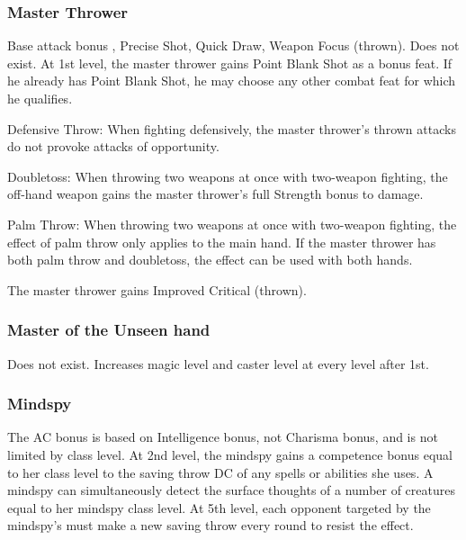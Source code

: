 \subsubsection{Master Thrower}
 Base attack bonus , Precise Shot, Quick Draw, Weapon Focus (thrown).
 Does not exist.
 At 1st level, the master thrower gains Point Blank Shot as a bonus feat. If he already has Point Blank Shot, he may choose any other combat feat for which he qualifies.
\begin{itemize*}
\item Defensive Throw: When fighting defensively, the master thrower's thrown attacks do not provoke attacks of opportunity.
\item Doubletoss: When throwing two weapons at once with two-weapon fighting, the off-hand weapon gains the master thrower's full Strength bonus to damage.
\item Palm Throw: When throwing two weapons at once with two-weapon fighting, the effect of palm throw only applies to the main hand. If the master thrower has both palm throw and doubletoss, the effect can be used with both hands.
\end{itemize*}
 The master thrower gains Improved Critical (thrown).

\subsubsection{Master of the Unseen hand}
 Does not exist.
 Increases magic level and caster level at every level after 1st.

\subsubsection{Mindspy}
 The AC bonus is based on Intelligence bonus, not Charisma bonus, and is not limited by class level.
 At 2nd level, the mindspy gains a competence bonus equal to her class level to the saving throw DC of any  spells or abilities she uses.
 A mindspy can simultaneously detect the surface thoughts of a number of creatures equal to her mindspy class level.
 At 5th level, each opponent targeted by the mindspy's  must make a new saving throw every round to resist the effect.

